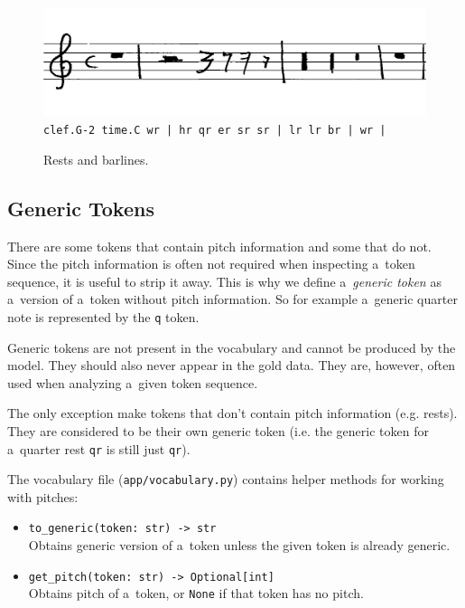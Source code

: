 \begin{figure}[h]
    \centering
    \includegraphics[width=140mm]{../img/rests-and-barlines}
    \verb`clef.G-2 time.C wr | hr qr er sr sr | lr lr br | wr |`
    \caption{Rests and barlines.}
    \label{fig4:RestsAndBarlines}
\end{figure}


\subsection{Generic Tokens}

There are some tokens that contain pitch information and some that do not. Since the pitch information is often not required when inspecting a~token sequence, it is useful to strip it away. This is why we define a~\emph{generic token} as a~version of a~token without pitch information. So for example a~generic quarter note is represented by the \texttt{q} token.

Generic tokens are not present in the vocabulary and cannot be produced by the model. They should also never appear in the gold data. They are, however, often used when analyzing a~given token sequence.

The only exception make tokens that don't contain pitch information (e.g. rests). They are considered to be their own generic token (i.e. the generic token for a~quarter rest \texttt{qr} is still just \texttt{qr}).

The vocabulary file (\texttt{app/vocabulary.py}) contains helper methods for working with pitches:

\begin{itemize}
\item \verb"to_generic(token: str) -> str"\\
Obtains generic version of a~token unless the given token is already generic.
\item \verb"get_pitch(token: str) -> Optional[int]"\\
Obtains pitch of a~token, or \texttt{None} if that token has no pitch.
\end{itemize}


